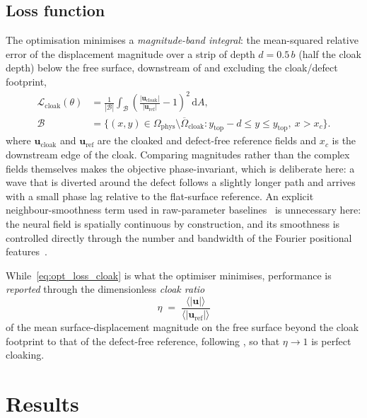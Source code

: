 \documentclass[preprint,12pt]{elsarticle}
\newcommand{\mbf}[1]{\mathbf{#1}}
\newcommand{\be}{\begin{equation}}
\newcommand{\ee}{\end{equation}}
\newcommand{\mcl}[1]{\mathcal{#1}}
\begin{document}
\subsection{Loss function}

The optimisation minimises a
\emph{magnitude-band integral}: the mean-squared relative error of the
displacement magnitude over a strip of depth $d=0.5\,b$ (half the cloak
depth) below the free surface, downstream of and excluding the
cloak/defect footprint,
\begin{subequations}\label{eq:opt_loss_cloak}
\begin{align}
  \mcl{L}_{\mathrm{cloak}}(\theta)
  &= \frac{1}{|\mcl{B}|}\int_{\mcl{B}}
      \left(\frac{|\mbf{u}_{\mathrm{cloak}}|}{|\mbf{u}_{\mathrm{ref}}|}-1\right)^{2}
      \,\mathrm{d}A, \label{eq:opt_loss_cloak_L}\\
  \mcl{B}&=\bigl\{(x,y)\in\Omega_{\mathrm{phys}}\setminus\overline{\Omega}_{\mathrm{cloak}}
     : y_{\mathrm{top}}-d\le y\le y_{\mathrm{top}},\ x>x_c\bigr\}.
     \label{eq:opt_loss_cloak_B}
\end{align}
\end{subequations}
where $\mbf{u}_{\mathrm{cloak}}$ and $\mbf{u}_{\mathrm{ref}}$ are the
cloaked and defect-free reference fields and $x_c$ is the downstream edge
of the cloak. Comparing magnitudes rather than the complex fields
themselves makes the objective phase-invariant, which is deliberate here: a wave
that is diverted around the defect follows a slightly longer path and
arrives with a small phase lag relative to the flat-surface reference.
An explicit
neighbour-smoothness term used in raw-parameter
baselines~\citep{wang2022} is unnecessary here: the neural field is
spatially continuous by construction, and its smoothness is controlled
directly through the number and bandwidth of the Fourier positional
features~\citep{tancik2020fourier}.

While~\eqref{eq:opt_loss_cloak} is what the optimiser minimises, performance
is \emph{reported} through the dimensionless \emph{cloak ratio}
\be\label{eq:cloak_ratio}
  \eta \;=\;
  \frac{\langle|\mbf{u}|\rangle}{\langle|\mbf{u}_{\mathrm{ref}}|\rangle}
\ee
of the mean surface-displacement magnitude on the free surface beyond the
cloak footprint to that of the defect-free reference, following
\citet{chatzopoulos2023}, so that $\eta\to1$ is perfect cloaking.

\section{Results}\label{sec:results}
\end{document}
